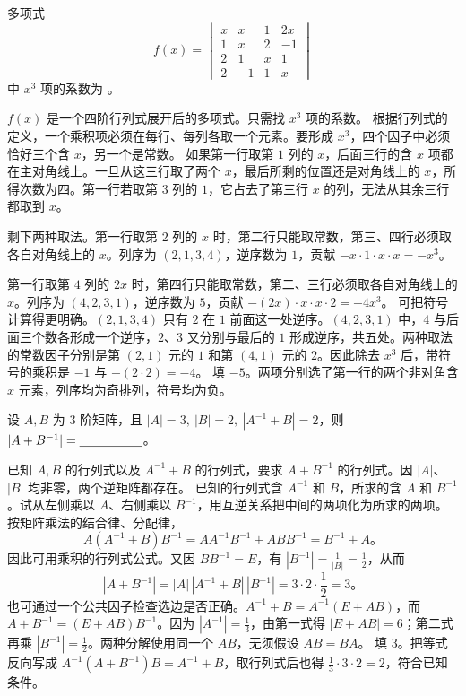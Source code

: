 \documentclass[UTF8,zihao=-4,fontset=fandol]{ctexart}
\begin{document}
多项式
\[
f(x)=\begin{vmatrix}
x & x & 1 & 2x\\
1 & x & 2 & -1\\
2 & 1 & x & 1\\
2 & -1 & 1 & x
\end{vmatrix}
\]
中 $x^3$ 项的系数为 \blank。

\Solution
\Known $f(x)$ 是一个四阶行列式展开后的多项式。只需找 $x^3$ 项的系数。
\Method 根据行列式的定义，一个乘积项必须在每行、每列各取一个元素。要形成 $x^3$，四个因子中必须恰好三个含 $x$，另一个是常数。
\Derive 如果第一行取第 $1$ 列的 $x$，后面三行的含 $x$ 项都在主对角线上。一旦从这三行取了两个 $x$，最后所剩的位置还是对角线上的 $x$，所得次数为四。第一行若取第 $3$ 列的 $1$，它占去了第三行 $x$ 的列，无法从其余三行都取到 $x$。

剩下两种取法。第一行取第 $2$ 列的 $x$ 时，第二行只能取常数，第三、四行必须取各自对角线上的 $x$。列序为 $(2,1,3,4)$，逆序数为 $1$，贡献 $-x\cdot 1\cdot x\cdot x=-x^3$。

第一行取第 $4$ 列的 $2x$ 时，第四行只能取常数，第二、三行必须取各自对角线上的 $x$。列序为 $(4,2,3,1)$，逆序数为 $5$，贡献 $-(2x)\cdot x\cdot x\cdot2=-4x^3$。
可把符号计算得更明确。$(2,1,3,4)$ 只有 $2$ 在 $1$ 前面这一处逆序。$(4,2,3,1)$ 中，$4$ 与后面三个数各形成一个逆序，$2$、$3$ 又分别与最后的 $1$ 形成逆序，共五处。两种取法的常数因子分别是第 $(2,1)$ 元的 $1$ 和第 $(4,1)$ 元的 $2$。因此除去 $x^3$ 后，带符号的乘积是 $-1$ 与 $-(2\cdot2)=-4$。
\Verify 填 $\boxed{-5}$。两项分别选了第一行的两个非对角含 $x$ 元素，列序均为奇排列，符号均为负。

设 $A,B$ 为 $3$ 阶矩阵，且 $|A|=3,\ |B|=2,\ |A^{-1}+B|=2$，则 $|A+B^{-1}|=\underline{\hspace{5em}}$。

\Solution
\Known 已知 $A,B$ 的行列式以及 $A^{-1}+B$ 的行列式，要求 $A+B^{-1}$ 的行列式。因 $|A|$、$|B|$ 均非零，两个逆矩阵都存在。
\Method 已知的行列式含 $A^{-1}$ 和 $B$，所求的含 $A$ 和 $B^{-1}$。试从左侧乘以 $A$、右侧乘以 $B^{-1}$，用互逆关系把中间的两项化为所求的两项。
\Derive 按矩阵乘法的结合律、分配律，
\[
A(A^{-1}+B)B^{-1}
=AA^{-1}B^{-1}+ABB^{-1}
=B^{-1}+A\text{。}
\]
因此可用乘积的行列式公式。又因 $BB^{-1}=E$，有 $|B^{-1}|=\frac{1}{|B|}=\frac{1}{2}$，从而
\[
|A+B^{-1}|=|A|\,|A^{-1}+B|\,|B^{-1}|
=3\cdot2\cdot\frac{1}{2}=3\text{。}
\]
也可通过一个公共因子检查选边是否正确。$A^{-1}+B=A^{-1}(E+AB)$，而 $A+B^{-1}=(E+AB)B^{-1}$。因为 $|A^{-1}|=\frac{1}{3}$，由第一式得 $|E+AB|=6$；第二式再乘 $|B^{-1}|=\frac{1}{2}$。两种分解使用同一个 $AB$，无须假设 $AB=BA$。
\Verify 填 $\boxed{3}$。把等式反向写成 $A^{-1}(A+B^{-1})B=A^{-1}+B$，取行列式后也得 $\frac{1}{3}\cdot3\cdot2=2$，符合已知条件。
\end{document}
